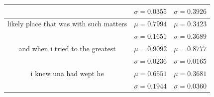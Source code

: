 \begin{table}[tbp]
\begin{center}
\begin{tabular}{ccc}
                                                      & \(\sigma=0.0355\)                                 & \(\sigma=0.3926\)           \\
            \midrule
            likely place that was with such matters   & \(\mu=0.7994\)                                    & \(\mu=0.3423\)              \\
                                                      & \(\sigma=0.1651\)                                 & \(\sigma=0.3689\)           \\
            \midrule
            and when i tried to the greatest          & \(\mu=0.9092\)                                    & \(\mu=0.8777\)              \\
                                                      & \(\sigma=0.0236\)                                 & \(\sigma=0.0165\)           \\
            \midrule
            i knew una had wept  he                   & \(\mu=0.6551\)                                    & \(\mu=0.3681\)              \\
                                                      & \(\sigma=0.1944\)                                 & \(\sigma=0.0360\)           \\
            \bottomrule
        \end{tabular}\label{tab2}
    \end{center}
\end{table}

